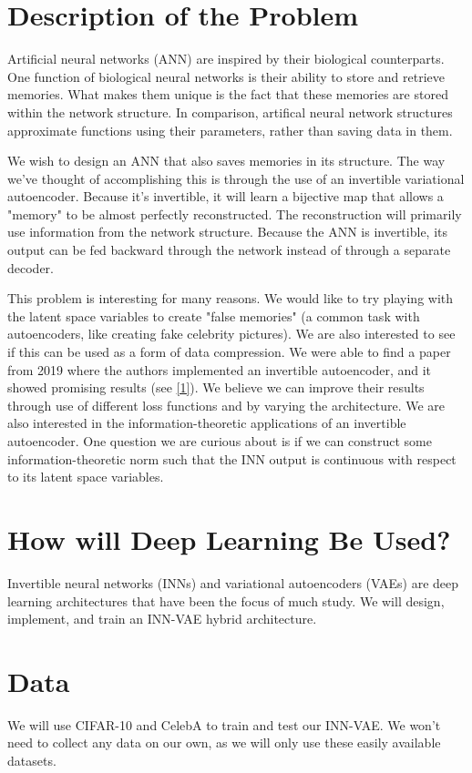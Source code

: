 \documentclass[11pt,letterpaper]{article}
\begin{document}
\section{Description of the Problem}

Artificial neural networks (ANN) are inspired by their biological counterparts.
One function of biological neural networks is their ability to store and retrieve memories.
What makes them unique is the fact that these memories are stored within the network structure.
In comparison, artifical neural network structures approximate functions using their parameters, rather than saving data in them.

We wish to design an ANN that also saves memories in its structure.
The way we've thought of accomplishing this is through the use of an invertible variational autoencoder.
Because it's invertible, it will learn a bijective map that allows a "memory" to be almost perfectly reconstructed.
The reconstruction will primarily use information from the network structure.
Because the ANN is invertible, its output can be fed backward through the network instead of through a separate decoder.

This problem is interesting for many reasons.
We would like to try playing with the latent space variables to create "false memories" (a common task with autoencoders, like creating fake celebrity pictures).
We are also interested to see if this can be used as a form of data compression.
We were able to find a paper from 2019 where the authors implemented an invertible autoencoder, and it showed promising results (see \href{https://doi.org/10.1007/978-3-030-33676-9_31}{[1]}).
We believe we can improve their results through use of different loss functions and by varying the architecture.
We are also interested in the information-theoretic applications of an invertible autoencoder.
One question we are curious about is if we can construct some information-theoretic norm such that the INN output is continuous with respect to its latent space variables.

\section{How will Deep Learning Be Used?}
Invertible neural networks (INNs) and variational autoencoders (VAEs) are deep learning architectures that have been the focus of much study.
We will design, implement, and train an INN-VAE hybrid architecture.

\section{Data}
We will use CIFAR-10 and CelebA to train and test our INN-VAE.
We won't need to collect any data on our own, as we will only use these easily available datasets.
\end{document}
